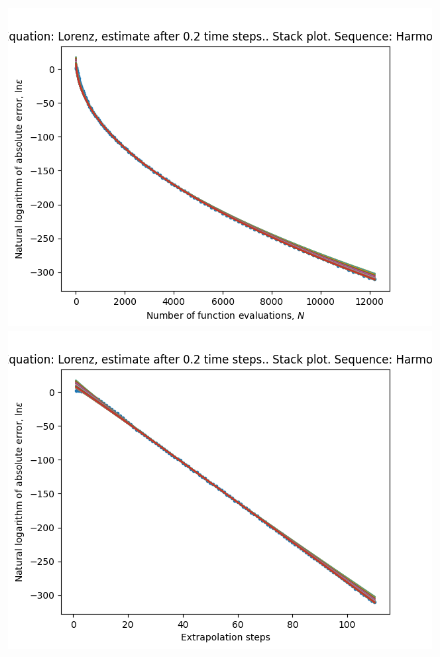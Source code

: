 \begin{figure}[H]
\centering
\begin{minipage}{0.45\textwidth}
\centering
\includegraphics[scale=0.45]{../results/emr_plots/lorenz_02_hp_harmonic_stack.png}
\end{minipage}
\begin{minipage}{0.45\textwidth}
\centering
\includegraphics[scale=0.45]{../results/emr_plots/lorenz_02_hp_harmonic_steps_stack.png}
\end{minipage}
\end{figure}

